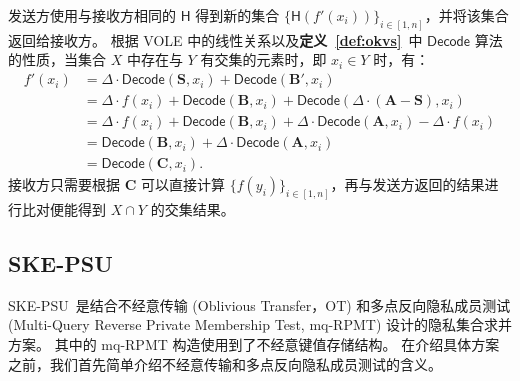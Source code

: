 发送方使用与接收方相同的 $\mathsf{H}$ 得到新的集合 $\{\mathsf{H}(f'(x_i))\}_{i\in [1,n]}$，并将该集合返回给接收方。
根据 VOLE 中的线性关系以及\textbf{定义~\ref{def:okvs}}~中 $\mathsf{Decode}$ 算法的性质，当集合 $X$ 中存在与 $Y$ 有交集的元素时，即 $x_i \in Y$ 时，有：
\begin{align}
  f'(x_i) & = \Delta\cdot \mathsf{Decode}(\mathbf{S}, x_i) + \mathsf{Decode}(\mathbf{B}', x_i) \\
  & = \Delta \cdot f(x_i) + \mathsf{Decode}(\mathbf{B}, x_i) + \mathsf{Decode}(\Delta\cdot(\mathbf{A}-\mathbf{S}), x_i) \\
  & = \Delta\cdot f(x_i) + \mathsf{Decode}(\mathbf{B}, x_i) + \Delta\cdot\mathsf{Decode}(\mathbf{A}, x_i) - \Delta \cdot f(x_i) \\
  & = \mathsf{Decode}(\mathbf{B}, x_i) + \Delta \cdot \mathsf{Decode}(\mathbf{A}, x_i) \\
  & = \mathsf{Decode}(\mathbf{C}, x_i).
\end{align}
接收方只需要根据 $\mathbf{C}$ 可以直接计算 $\{f(y_i)\}_{i\in [1,n]}$，再与发送方返回的结果进行比对便能得到 $X\cap Y$ 的交集结果。




\subsection{SKE-PSU}

SKE-PSU~\cite{zhang2023linear}是结合不经意传输 (Oblivious Transfer，OT) 和多点反向隐私成员测试 (Multi-Query Reverse Private Membership Test, mq-RPMT) 设计的隐私集合求并方案。
其中的 mq-RPMT 构造使用到了不经意键值存储结构。
在介绍具体方案之前，我们首先简单介绍不经意传输和多点反向隐私成员测试的含义。

